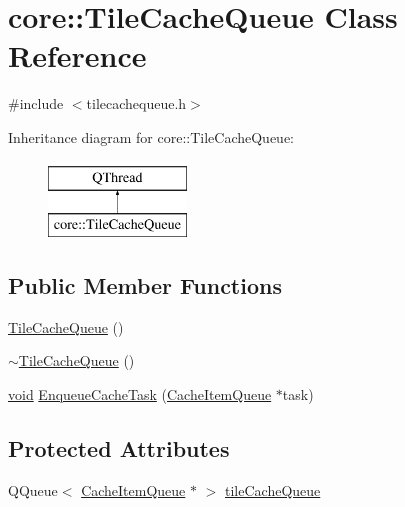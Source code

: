 \hypertarget{classcore_1_1_tile_cache_queue}{\section{core\-:\-:Tile\-Cache\-Queue Class Reference}
\label{classcore_1_1_tile_cache_queue}
}


{\ttfamily \#include $<$tilecachequeue.\-h$>$}

Inheritance diagram for core\-:\-:Tile\-Cache\-Queue\-:\begin{figure}[H]
\begin{center}
\leavevmode
\includegraphics[height=2.000000cm]{classcore_1_1_tile_cache_queue}
\end{center}
\end{figure}
\subsection*{Public Member Functions}
\begin{DoxyCompactItemize}
\item 
\hyperlink{group___o_p_map_widget_gaf4b26a2fbfd128dce8b96fa82f4230dd}{Tile\-Cache\-Queue} ()
\item 
\hyperlink{group___o_p_map_widget_ga09862b0024b636bee196029e0a98cfc4}{$\sim$\-Tile\-Cache\-Queue} ()
\item 
\hyperlink{group___u_a_v_objects_plugin_ga444cf2ff3f0ecbe028adce838d373f5c}{void} \hyperlink{group___o_p_map_widget_gaa3b5dbe5d3c7b4f98f540bb4bb38f3d1}{Enqueue\-Cache\-Task} (\hyperlink{classcore_1_1_cache_item_queue}{Cache\-Item\-Queue} $\ast$task)
\end{DoxyCompactItemize}
\subsection*{Protected Attributes}
\begin{DoxyCompactItemize}
\item 
Q\-Queue$<$ \hyperlink{classcore_1_1_cache_item_queue}{Cache\-Item\-Queue} $\ast$ $>$ \hyperlink{group___o_p_map_widget_ga6bb4a109ac678df86dff7fe8a1a02944}{tile\-Cache\-Queue}
\end{DoxyCompactItemize}


